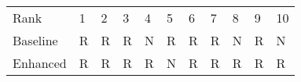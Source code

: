 \begin{tabular}{lllllllllll}
Rank & 1 & 2 & 3 & 4 & 5 & 6 & 7 & 8 & 9 & 10 \\
Baseline & R & R & R & N & R & R & R & N & R & N \\
Enhanced & R & R & R & R & N & R & R & R & R & R \\
\end{tabular}

